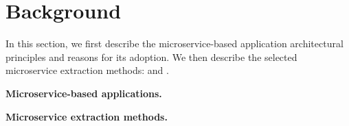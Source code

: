 \section{Background}
\label{sec:background}

In this section, we first describe the microservice-based application architectural principles and reasons for its adoption. 
We then describe the selected microservice extraction methods: \bn and \fs. 

\vspace{0.05in}
\noindent 
{\bf Microservice-based applications.}


\vspace{0.05in}
\noindent 
{\bf Microservice extraction methods.}